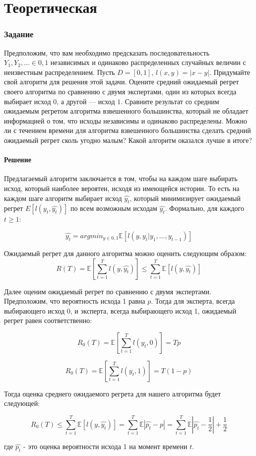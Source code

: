 \documentclass[a4paper,14pt]{extarticle}
\begin{document}
\newpage

\part{Теоретическая}
\section{Задание }

Предположим, что вам необходимо предсказать последовательность $Y_1, Y_2, \ldots \in {0, 1}$ независимых и одинаково распределенных случайных величин с неизвестным распределением. Пусть $D = [0, 1]$, $l(x, y) = |x - y|$. Придумайте свой алгоритм для решения этой задачи. Оцените средний ожидаемый регрет своего алгоритма по сравнению с двумя экспертами, один из которых всегда выбирает исход $0$, а другой — исход $1$. Сравните результат со средним ожидаемым регретом алгоритма взвешенного большинства, который не обладает информацией о том, что исходы независимы и одинаково распределены. Можно ли с течением времени для алгоритма взвешенного большинства сделать средний ожидаемый регрет сколь угодно малым? Какой алгоритм оказался лучше в итоге?

\subsection{Решение}

Предлагаемый алгоритм заключается в том, чтобы на каждом шаге выбирать исход, который наиболее вероятен, исходя из имеющейся истории. То есть на каждом шаге алгоритм выбирает исход $\hat{y_t}$, который минимизирует ожидаемый регрет $E[l(y_t,\hat{y_t})]$ по всем возможным исходам $\hat{y_t}$. Формально, для каждого $t\geq 1$:

$$\hat{y_t} = argmin_{y \in {0, 1}}\mathbb{E}\left[l(y, y_t|y_1, \ldots, y_{t-1})\right]$$

Ожидаемый регрет для данного алгоритма можно оценить следующим образом:
$$R(T) = \mathbb{E}\left[\sum_{t=1}^{T} l\left(y, \hat{y_t}\right)\right] \le \sum_{t=1}^{T}\mathbb{E}\left[l\left(y, \hat{y_t}\right)\right]$$

Далее оценим ожидаемый регрет по сравнению с двумя экспертами. Предположим, что вероятность исхода 1 равна $p$. Тогда для эксперта, всегда выбирающего исход 0, и эксперта, всегда выбирающего исход 1, ожидаемый регрет равен соответственно:

$$R_0(T) = \mathbb{E}\left[\sum_{t=1}^{T} l\left(y_t, 0\right)\right] = Tp$$

$$R_0(T) = \mathbb{E}\left[\sum_{t=1}^{T} l\left(y_t, 1\right)\right] = T(1 - p)$$

Тогда оценка среднего ожидаемого регрета для нашего алгоритма будет следующей:

$$R_0(T) \le \sum_{t=1}^{T}\mathbb{E}\left[l\left(y, \hat{y_t}\right)\right] = \sum_{t=1}^{T}\mathbb{E}\left|\hat{p_t} - p\right| = \sum_{t=1}^{T}\mathbb{E}\left|\hat{p_t} - \frac{1}{2}\right| + \frac{1}{2}$$

где $\hat{p_t}$ - это оценка вероятности исхода 1 на момент времени $t$.
\end{document}
